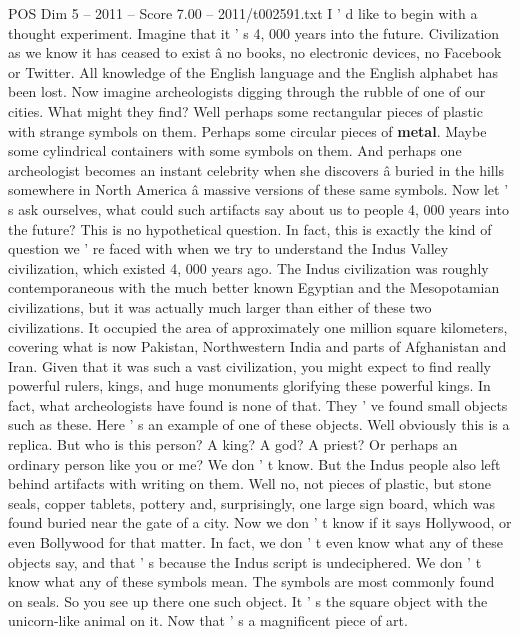 \begin{textsample}{POS Dim 5 – 2011 – Score 7.00 – 2011/t002591.txt}  \label{ex:f5_pos_033}
I ' d like to begin with a thought experiment.
Imagine that it ' s 4, 000 years into the future.
Civilization as we know it has ceased to exist â no books, no electronic devices, no Facebook or Twitter.
All knowledge of the English language and the English alphabet has been lost.
Now imagine archeologists digging through the rubble of one of our cities.
What might they find?
Well perhaps some rectangular pieces of plastic with strange symbols on them.
Perhaps some circular pieces of \textbf{metal}.
Maybe some cylindrical containers with some symbols on them.
And perhaps one archeologist becomes an instant celebrity when she discovers â buried in the hills somewhere in North America â massive versions of these same symbols.
Now let ' s ask ourselves, what could such artifacts say about us to people 4, 000 years into the future?
This is no hypothetical question.
In fact, this is exactly the kind of question we ' re faced with when we try to understand the Indus Valley civilization, which existed 4, 000 years ago.
The Indus civilization was roughly contemporaneous with the much better known Egyptian and the Mesopotamian civilizations, but it was actually much larger than either of these two civilizations.
It occupied the area of approximately one million square kilometers, covering what is now Pakistan, Northwestern India and parts of Afghanistan and Iran.
Given that it was such a vast civilization, you might expect to find really powerful rulers, kings, and huge monuments glorifying these powerful kings.
In fact, what archeologists have found is none of that.
They ' ve found small objects such as these.
Here ' s an example of one of these objects.
Well obviously this is a replica.
But who is this person?
A king?
A god?
A priest?
Or perhaps an ordinary person like you or me?
We don ' t know.
But the Indus people also left behind artifacts with writing on them.
Well no, not pieces of plastic, but stone seals, copper tablets, pottery and, surprisingly, one large sign board, which was found buried near the gate of a city.
Now we don ' t know if it says Hollywood, or even Bollywood for that matter.
In fact, we don ' t even know what any of these objects say, and that ' s because the Indus script is undeciphered.
We don ' t know what any of these symbols mean.
The symbols are most commonly found on seals.
So you see up there one such object.
It ' s the square object with the unicorn-like animal on it.
Now that ' s a magnificent piece of art.

\end{textsample}
